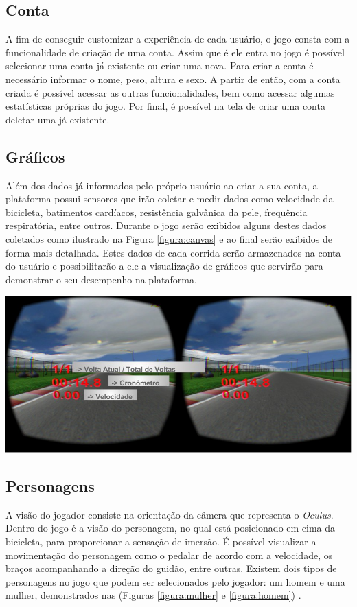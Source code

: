 \subsection{Conta}
A fim de conseguir customizar a experiência de cada usuário, o jogo consta com a funcionalidade de criação de uma conta. Assim que é ele entra no jogo é possível selecionar uma conta já existente ou criar uma nova. Para criar a conta é necessário informar o nome, peso, altura e sexo. A partir de então, com a conta criada é possível acessar as outras funcionalidades, bem como acessar algumas estatísticas próprias do jogo. Por final, é possível na tela de criar uma conta deletar uma já existente.

\subsection{Gráficos}
Além dos dados já informados pelo próprio usuário ao criar a sua conta, a plataforma possui sensores que irão coletar e medir dados como velocidade da bicicleta, batimentos cardíacos, resistência galvânica da pele, frequência respiratória, entre outros. Durante o jogo serão exibidos alguns destes dados coletados como ilustrado na Figura \ref{figura:canvas} e ao final serão exibidos de forma mais detalhada. Estes dados de cada corrida serão armazenados na conta do usuário e possibilitarão a ele a visualização de gráficos que servirão para demonstrar o seu desempenho na plataforma.

\begin{center}
	\includegraphics[scale=0.4]{figuras/canvas}
	\label{figura:canvas}
\end{center}

\subsection{Personagens}
A visão do jogador consiste na orientação da câmera que representa o \textit{Oculus}. Dentro do jogo é a visão do personagem, no qual está posicionado em cima da bicicleta, para proporcionar a sensação de imersão. É possível visualizar a movimentação do personagem como o pedalar de acordo com a velocidade, os braços acompanhando a direção do guidão, entre outras. Existem dois tipos de personagens no jogo que podem ser selecionados pelo jogador: um homem e uma mulher, demonstrados nas (Figuras \ref{figura:mulher} e \ref{figura:homem}) .

